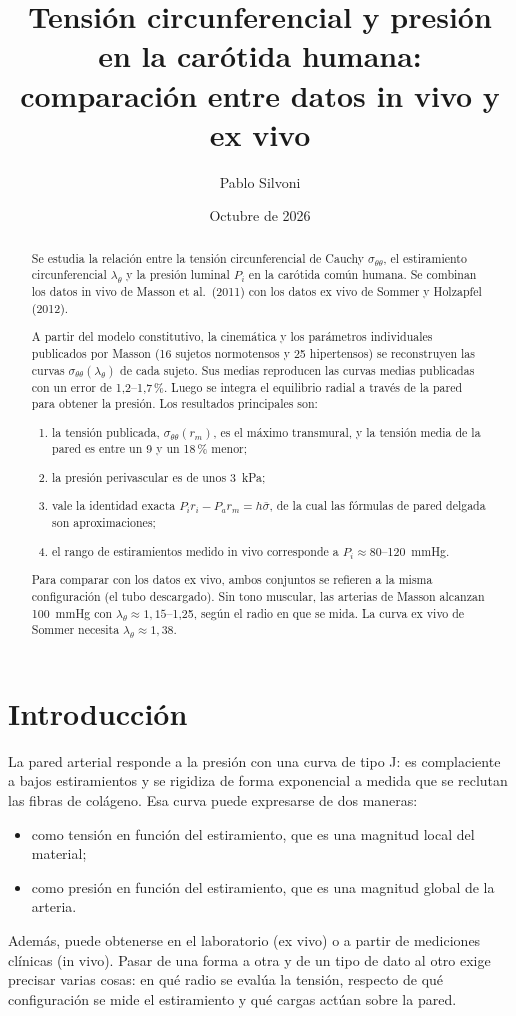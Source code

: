 \documentclass[11pt,a4paper]{article}
\title{Tensión circunferencial y presión en la carótida humana:\\
comparación entre datos in vivo y ex vivo}
\author{Pablo Silvoni}
\date{Octubre de 2026}
\newcommand{\stt}{\sigma_{\theta\theta}}
\newcommand{\lt}{\lambda_\theta}
\begin{document}
\maketitle

\begin{abstract}
Se estudia la relación entre la tensión circunferencial de Cauchy $\stt$, el estiramiento circunferencial $\lt$ y la presión luminal $P_i$ en la carótida común humana. Se combinan los datos in vivo de Masson et al.\ (2011) con los datos ex vivo de Sommer y Holzapfel (2012).

A partir del modelo constitutivo, la cinemática y los parámetros individuales publicados por Masson (16 sujetos normotensos y 25 hipertensos) se reconstruyen las curvas $\stt(\lt)$ de cada sujeto. Sus medias reproducen las curvas medias publicadas con un error de 1,2--1,7\,\%. Luego se integra el equilibrio radial a través de la pared para obtener la presión. Los resultados principales son:
\begin{enumerate}[label=(\roman*)]
\item la tensión publicada, $\stt(r_m)$, es el máximo transmural, y la tensión media de la pared es entre un 9 y un 18\,\% menor;
\item la presión perivascular es de unos 3~kPa;
\item vale la identidad exacta $P_i r_i-P_a r_m=h\bar\sigma$, de la cual las fórmulas de pared delgada son aproximaciones;
\item el rango de estiramientos medido in vivo corresponde a $P_i\approx80$--120~mmHg.
\end{enumerate}
Para comparar con los datos ex vivo, ambos conjuntos se refieren a la misma configuración (el tubo descargado). Sin tono muscular, las arterias de Masson alcanzan 100~mmHg con $\lt\approx1{,}15$--1,25, según el radio en que se mida. La curva ex vivo de Sommer necesita $\lt\approx1{,}38$.
\end{abstract}

\tableofcontents
\newpage

\section{Introducción}
La pared arterial responde a la presión con una curva de tipo J: es complaciente a bajos estiramientos y se rigidiza de forma exponencial a medida que se reclutan las fibras de colágeno. Esa curva puede expresarse de dos maneras:
\begin{itemize}
\item como tensión en función del estiramiento, que es una magnitud local del material;
\item como presión en función del estiramiento, que es una magnitud global de la arteria.
\end{itemize}
Además, puede obtenerse en el laboratorio (ex vivo) o a partir de mediciones clínicas (in vivo). Pasar de una forma a otra y de un tipo de dato al otro exige precisar varias cosas: en qué radio se evalúa la tensión, respecto de qué configuración se mide el estiramiento y qué cargas actúan sobre la pared.
\end{document}

